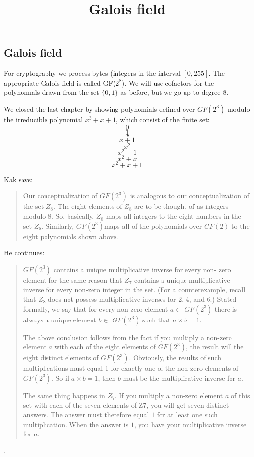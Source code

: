 \documentclass[11pt, oneside]{article}
\title{Galois field}
\date{}
\begin{document}
\maketitle

\Large

\subsection*{Galois field}

For cryptography we process bytes (integers in the interval $[0,255]$.  The appropriate Galois field is called GF($2^8$).  We will use cofactors for the polynomials drawn from the set $\{0,1\}$ as before, but we go up to degree 8.

We closed the last chapter by showing polynomials defined over $GF(2^3)$ modulo the irreducible polynomial $x^3 + x + 1$, which consist of the finite set:
\[ 0 \]
\[ 1 \]
\[ x \]
\[ x + 1 \]
\[ x^2 \]
\[ x^2 + 1 \]
\[ x^2 + x \]
\[ x^2 + x + 1 \]


Kak says:

\begin{quote} Our conceptualization of $GF(2^3)$ is analogous to our conceptualization of the set $Z_8$. The eight elements of $Z_8$ are to be thought of as integers modulo 8. So, basically, $Z_8$ maps all integers to the eight numbers in the set $Z_8$. Similarly, $GF(2^3)$maps all of the polynomials over $GF(2)$ to the eight polynomials shown above.\end{quote}

He continues:

\begin{quote}$GF(2^3)$ contains a unique multiplicative inverse for every non- zero element for the same reason that $Z_7$ contains a unique multiplicative inverse for every non-zero integer in the set. (For a counterexample, recall that $Z_8$ does not possess multiplicative inverses for 2, 4, and 6.) Stated formally, we say that for every non-zero element $a \in$ $GF(2^3)$ there is always a unique element $b \in$ $GF(2^3)$ such that $a \times b = 1$.

The above conclusion follows from the fact if you multiply a non-zero element $a$ with each of the eight elements of $GF(2^3)$, the result will the eight distinct elements of $GF(2^3)$. Obviously, the results of such multiplications must equal 1 for exactly one of the non-zero elements of $GF(2^3)$. So if $a \times b = 1$, then $b$ must be the multiplicative inverse for $a$.

The same thing happens in $Z_7$. If you multiply a non-zero element $a$ of this set with each of the seven elements of Z7, you will get seven distinct answers. The answer must therefore equal $1$ for at least one such multiplication. When the answer is $1$, you have your multiplicative inverse for $a$.\end{quote}.
\end{document}
